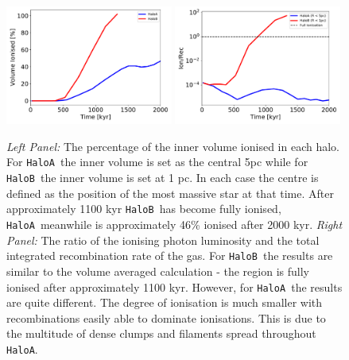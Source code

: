 \documentclass[graphics, twocolumn, usenatbib]{mn2e}
\newcommand{\ha} {\texttt{HaloA~}}
\newcommand{\hb} {\texttt{HaloB~}}
\newcommand{\hac} {\texttt{HaloA}}
\begin{document}
\begin{figure}
\centering
\begin{minipage}{175mm}      \begin{center} 
\centerline{
\includegraphics[width=0.49\textwidth]{FIGURES/Ionisation.pdf}
\includegraphics[width=0.49\textwidth]{FIGURES/Recombination.pdf}}
\caption{\textit{Left Panel:} The percentage of the inner volume ionised in each halo. For \ha the
    inner volume is set as the central 5pc while for \hb the inner volume is set at 1 pc. In each case
    the centre is defined as the position of the most massive star at that time. After approximately
    1100 kyr \hb has become fully ionised, \ha meanwhile is approximately 46\% ionised after 2000
    kyr. \textit{Right Panel:} The ratio of the ionising photon luminosity and the total integrated
    recombination rate of the gas. For \hb the results are similar to the volume averaged
    calculation - the region is fully ionised after approximately 1100 kyr. However, for \ha the
    results are quite different. The degree of ionisation is much smaller with recombinations easily
    able to dominate ionisations. This is due to the multitude of dense clumps and filaments
    spread throughout \hac. 
  }  \label{Fig:Ionisation}
\end{center} \end{minipage}

\end{figure}
\end{document}
